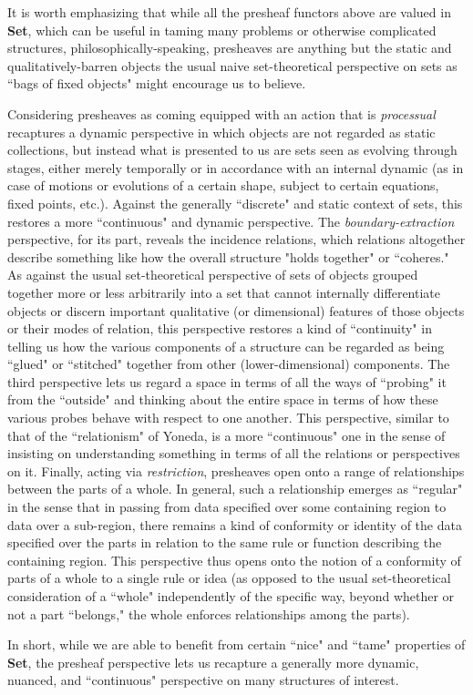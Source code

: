 \documentclass[11pt]{book}
\theoremstyle{definition}
\theoremstyle{definition}
\theoremstyle{definition}
\theoremstyle{theorem}
\theoremstyle{definition}
\begin{document}
It is worth emphasizing that while all the presheaf functors above are valued in \textbf{Set}, which can be useful in taming many problems or otherwise complicated structures, philosophically-speaking, presheaves are anything but the static and qualitatively-barren objects the usual naive set-theoretical perspective on sets as ``bags of fixed objects" might encourage us to believe. \par 
Considering presheaves as coming equipped with an action that is \textit{processual} recaptures a dynamic perspective in which objects are not regarded as static collections, but instead what is presented to us are sets seen as evolving through stages, either merely temporally or in accordance with an internal dynamic (as in case of motions or evolutions of a certain shape, subject to certain equations, fixed points, etc.). Against the generally ``discrete" and static context of sets, this restores a more ``continuous" and dynamic perspective. The \textit{boundary-extraction} perspective, for its part, reveals the incidence relations, which relations altogether describe something like how the overall structure "holds together" or ``coheres." As against the usual set-theoretical perspective of sets of objects grouped together more or less arbitrarily into a set that cannot internally differentiate objects or discern important qualitative (or dimensional) features of those objects or their modes of relation, this perspective restores a kind of ``continuity" in telling us how the various components of a structure can be regarded as being ``glued" or ``stitched" together from other (lower-dimensional) components. The third perspective lets us regard a space in terms of all the ways of ``probing" it from the ``outside" and thinking about the entire space in terms of how these various probes behave with respect to one another. This perspective, similar to that of the ``relationism" of Yoneda, is a more ``continuous" one in the sense of insisting on understanding something in terms of all the relations or perspectives on it. Finally, acting via \textit{restriction}, presheaves open onto a range of relationships between the parts of a whole. In general, such a relationship emerges as ``regular" in the sense that in passing from data specified over some containing region to data over a sub-region, there remains a kind of conformity or identity of the data specified over the parts in relation to the same rule or function describing the containing region. This perspective thus opens onto the notion of a conformity of parts of a whole to a single rule or idea (as opposed to the usual set-theoretical consideration of a ``whole" independently of the specific way, beyond whether or not a part ``belongs," the whole enforces relationships among the parts). \par 
In short, while we are able to benefit from certain ``nice" and ``tame" properties of \textbf{Set}, the presheaf perspective lets us recapture a generally more dynamic, nuanced, and ``continuous" perspective on many structures of interest.
\end{document}
